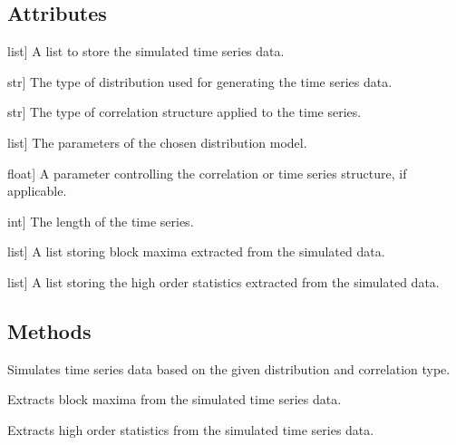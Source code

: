\documentclass[a4paper,11pt,openany,english]{sphinxmanual}
\begin{document}
\begin{fulllineitems}
\begin{description}
\end{description}


\subsection{Attributes}
\label{\detokenize{api_topt:attributes}}\begin{description}
\sphinxlineitem{values}{[}list{]}
\sphinxAtStartPar
A list to store the simulated time series data.

\sphinxlineitem{distr}{[}str{]}
\sphinxAtStartPar
The type of distribution used for generating the time series data.

\sphinxlineitem{corr}{[}str{]}
\sphinxAtStartPar
The type of correlation structure applied to the time series.

\sphinxlineitem{modelparams}{[}list{]}
\sphinxAtStartPar
The parameters of the chosen distribution model.

\sphinxlineitem{ts}{[}float{]}
\sphinxAtStartPar
A parameter controlling the correlation or time series structure, if applicable.

\sphinxlineitem{len}{[}int{]}
\sphinxAtStartPar
The length of the time series.

\sphinxlineitem{blockmaxima}{[}list{]}
\sphinxAtStartPar
A list storing block maxima extracted from the simulated data.

\sphinxlineitem{high\_order\_stats}{[}list{]}
\sphinxAtStartPar
A list storing the high order statistics extracted from the simulated data.

\end{description}


\subsection{Methods}
\label{\detokenize{api_topt:methods}}\begin{description}
\sphinxAtStartPar
Simulates time series data based on the given distribution and correlation type.

\sphinxAtStartPar
Extracts block maxima from the simulated time series data.

\sphinxAtStartPar
Extracts high order statistics from the simulated time series data.

\end{description}



\end{fulllineitems}
\end{document}

